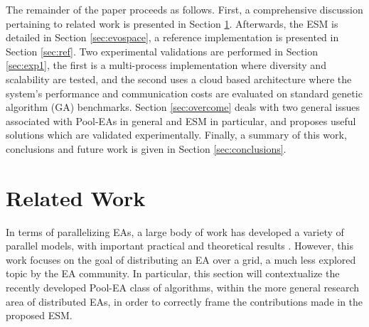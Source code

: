 %
%

The remainder of the paper proceeds as follows.
First, a comprehensive discussion pertaining to related work is presented in Section \ref{sec:related}.
Afterwards, the ESM is detailed in Section \ref{sec:evospace}, a reference implementation is presented in Section \ref{sec:ref}.
Two experimental validations are performed in Section \ref{sec:exp1}, the first is a multi-process implementation where diversity and scalability are tested,
and the second uses a cloud based architecture where the system's performance and communication costs are evaluated on standard genetic algorithm (GA) benchmarks.
Section \ref{sec:overcome} deals with two general issues associated with Pool-EAs in general and ESM in particular,
and proposes useful solutions which are validated experimentally.
Finally, a summary of this work, conclusions and future work is given in Section \ref{sec:conclusions}.
 

\section{Related Work}
\label{sec:related}
In terms of parallelizing EAs, a large body of work has developed a variety of parallel models, with
important practical and theoretical results \cite{parallelEA}.
However, this work focuses on the goal of distributing an EA over a grid, a much less explored topic by the EA community.
In particular, this section will contextualize the recently developed Pool-EA class of algorithms, within the more general research area of distributed EAs,
in order to correctly frame the contributions made in the proposed ESM.

